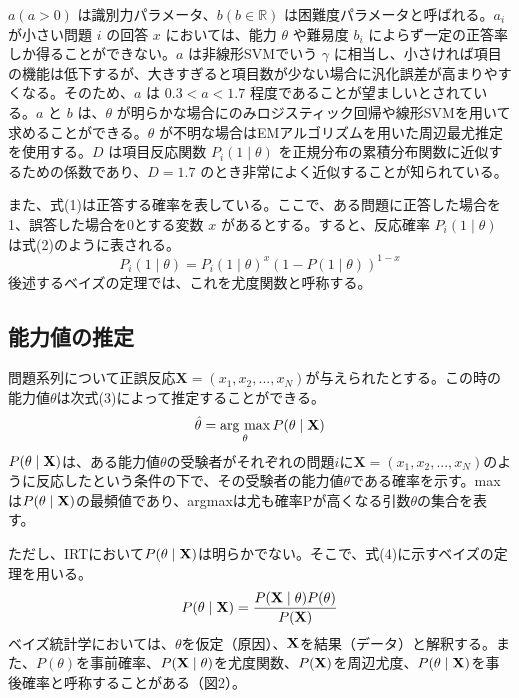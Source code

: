 \documentclass[12pt]{jarticle}
\begin{document}
$a (a > 0)$ は識別力パラメータ、$b (b \in \mathbb{R})$ は困難度パラメータと呼ばれる。$a_i$ が小さい問題 $i$ の回答 $x$ においては、能力 $\theta$ や難易度 $b_i$ によらず一定の正答率しか得ることができない。$a$ は非線形SVMでいう $\gamma$ に相当し、小さければ項目の機能は低下するが、大きすぎると項目数が少ない場合に汎化誤差が高まりやすくなる。そのため、$a$ は $0.3 < a < 1.7$ 程度であることが望ましいとされている。$a$ と $b$ は、$\theta$ が明らかな場合にのみロジスティック回帰や線形SVMを用いて求めることができる。$\theta$ が不明な場合はEMアルゴリズムを用いた周辺最尤推定を使用する。$D$ は項目反応関数 $P_i(1 \mid \theta)$ を正規分布の累積分布関数に近似するための係数であり、$D = 1.7$ のとき非常によく近似することが知られている。

また、式(1)は正答する確率を表している。ここで、ある問題に正答した場合を1、誤答した場合を0とする変数 $x$ があるとする。すると、反応確率 $P_i(1 \mid \theta)$ は式(2)のように表される。
\begin{equation}P_i(1\mid \theta)=P_i(1\mid \theta)^{x}(1-P(1 \mid \theta))^{1-x}\end{equation}
後述するベイズの定理では、これを尤度関数と呼称する。\\
\subsection{能力値の推定}
問題系列について正誤反応$\mathbf{X}=(x_1,x_2,...,x_N)$が与えられたとする。この時の能力値$\theta$は次式(3)によって推定することができる。
\begin{equation}
\hat{\theta} = \mathop{\rm arg~max}\limits_\theta P(\theta \mid {\bf X})\\
\end{equation}
$P(\theta \mid {\bf X})$は、ある能力値$\theta$の受験者がそれぞれの問題$i$に$\mathbf{X}=(x_1,x_2,...,x_N)$のように反応したという条件の下で、その受験者の能力値$\theta$である確率を示す。maxは$P(\theta \mid {\bf X})$の最頻値であり、argmaxは尤も確率Pが高くなる引数$\theta$の集合を表す。

ただし、IRTにおいて$P(\theta \mid {\bf X})$は明らかでない。そこで、式(4)に示すベイズの定理を用いる。
\begin{equation}
P(\theta \mid {\bf X}) = \frac{P({\bf X} \mid \theta) P(\theta)}{P(\bf{X)}}
\end{equation}
ベイズ統計学においては、$\theta$を仮定（原因）、$\bf{X}$を結果（データ）と解釈する。また、$P(\theta)$を事前確率、$P({\bf X} \mid \theta)$を尤度関数、$P({\bf X})$を周辺尤度、$P(\theta \mid {\bf X})$を事後確率と呼称することがある（図2）。
\end{document}
